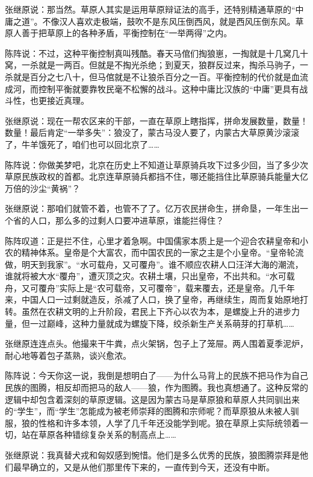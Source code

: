 \par 张继原说：那当然。草原人其实是运用草原辩证法的高手，还特别精通草原的“中庸之道”。不像汉人喜欢走极端，鼓吹不是东风压倒西风，就是西风压倒东风。草原人善于把草原上的各种矛盾，平衡控制在“一举两得”之内。
\par 陈阵说：不过，这种平衡控制真叫残酷。春天马倌们掏狼崽，一掏就是十几窝几十窝，一杀就是一两百。但就是不掏光杀绝；到夏天，狼群反过来，掏杀马驹子，一杀就是百分之七八十，但马倌就是不让狼杀百分之一百。平衡控制的代价就是血流成河，而控制平衡就要靠牧民毫不松懈的战斗。这种中庸比汉族的“中庸”更具有战斗性，也更接近真理。
\par 张继原说：现在一帮农区来的干部，一直在草原上瞎指挥，拼命发展数量，数量！数量！最后肯定“一举多失”：狼没了，蒙古马没人要了，内蒙古大草原黄沙滚滚了，牛羊饿死了，咱们也可以回北京了……
\par 陈阵说：你做美梦吧，北京在历史上不知道让草原骑兵攻下过多少回，当了多少次草原民族政权的首都。北京连草原骑兵都挡不住，哪还能挡住比草原骑兵能量大亿万倍的沙尘“黄祸”？
\par 张继原说：那咱们就管不着，也管不了了。亿万农民拼命生，拼命垦，一年生出一个省的人口，那么多的过剩人口要冲进草原，谁能拦得住？
\par 陈阵叹道：正是拦不住，心里才着急啊。中国儒家本质上是一个迎合农耕皇帝和小农的精神体系。皇帝是个大富农，而中国农民的一家之主是个小皇帝。“皇帝轮流做，明天到我家”。“水可载舟，又可覆舟”。谁不顺应农耕人口汪洋大海的潮流，谁就将被大水“覆舟”，遭灭顶之灾。农耕土壤，只出皇帝，不出共和。“水可载舟，又可覆舟”实际上是“农可载帝，又可覆帝”，载来覆去，还是皇帝。几千年来，中国人口一过剩就造反，杀减了人口，换了皇帝，再继续生，周而复始原地打转。虽然在农耕文明的上升阶段，君民上下齐心以农为本，是螺旋上升的进步力量，但一过巅峰，这种力量就成为螺旋下降，绞杀新生产关系萌芽的打草机……
\par 张继原连连点头。他撮来干牛粪，点火架锅，包子上了笼屉。两人围着夏季泥炉，耐心地等着包子蒸熟，谈兴愈浓。
\par 陈阵说：今天你这一说，我倒是想明白了——为什么马背上的民族不把马作为自己民族的图腾，相反却而把马的敌人——狼，作为图腾。我也真想通了。这种反常的逻辑中却包含着深刻的草原逻辑。这是因为蒙古马是草原狼和草原人共同驯出来的“学生”，而“学生”怎能成为被老师崇拜的图腾和宗师呢？而草原狼从未被人驯服，狼的性格和许多本领，人学了几千年还没能学到呢。狼在草原上实际统领着一切，站在草原各种错综复杂关系的制高点上……
\par 张继原说：我真替犬戎和匈奴感到惋惜。他们是多么优秀的民族，狼图腾崇拜是他们最早确立的，又是从他们那里传下来的，一直传到今天，还没有中断。
